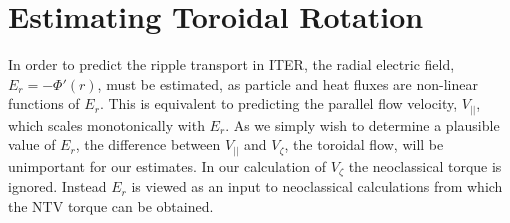 \documentclass[aip, pop, preprint]{revtex4-1}
\numberwithin{figure}{section}
\numberwithin{equation}{section}
\begin{document}
\FloatBarrier

\section{Estimating Toroidal Rotation}\label{rotation}

In order to predict the ripple transport in ITER, the radial electric field, $E_r = - \Phi'(r) $, must be estimated, as particle and heat fluxes are non-linear functions of $E_r$. This is equivalent to predicting the parallel flow velocity, $V_{||}$, which scales monotonically with $E_r$.  As we simply wish to determine a plausible value of $E_r$, the difference between $V_{||}$ and $V_{\zeta}$, the toroidal flow, will be unimportant for our estimates. In our calculation of $V_{\zeta}$ the neoclassical torque is ignored. Instead $E_r$ is viewed as an input to neoclassical calculations from which the NTV torque can be obtained. 
\end{document}
